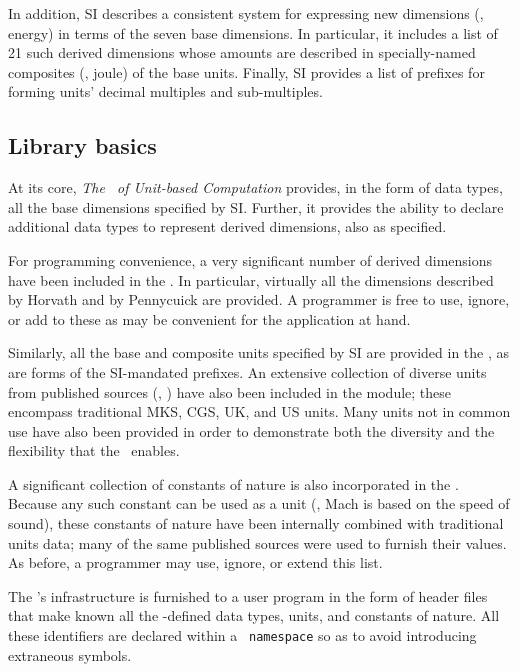 In addition, SI describes a consistent system
for expressing new dimensions
(\eg, energy) in terms of the seven base dimensions.
In particular,
it includes a list of 21 such derived dimensions
whose amounts are described
in specially-named composites (\eg, joule)
of the base units.
Finally,
SI provides a list of prefixes
for forming units' decimal multiples and sub-multiples.

\subsection{ Library basics }

At its core,
{\it The \SIlib\ of Unit-based Computation} provides,
in the form of data types,
all the base dimensions specified by SI.
Further, it provides the ability
to declare additional data types to represent derived dimensions,
also as specified.

For programming convenience,
a very significant number of derived dimensions
have been included in the \lib.
In particular,
virtually all the dimensions described
by Horvath \cite{Horvath}
and by Pennycuick \cite{Pennycuick}
are provided.
A programmer is free to use, ignore, or add to these
as may be convenient
for the application at hand.

Similarly, all the base and composite units specified by SI
are provided in the \lib,
as are forms of the SI-mandated prefixes.
An extensive collection of diverse units
from published sources
(\eg, \cite{Horvath,
	    Pennycuick,
	    ParticleBook,
	    Maire1,
	    Maire2})
have also been included in the module;
these encompass traditional MKS, CGS, UK, and US units.
Many units not in common use have also been provided
in order to demonstrate both the diversity and the flexibility
that the \lib\ enables.

A significant collection of constants of nature
is also incorporated in the \SIlib.
Because any such constant can be used as a unit
(\eg, Mach is based on the speed of sound),
these constants of nature have been internally combined
with traditional units data;
many of the same published sources
were used to furnish their values.
As before, a programmer may use, ignore, or extend this list.

The \SIlib's infrastructure
is furnished to a user program
in the form of header files
that make known
all the \lib-defined data types,
units, and constants of nature.
All these identifiers
are declared within a \cpp\ {\tt namespace}
so as to avoid introducing extraneous symbols.

